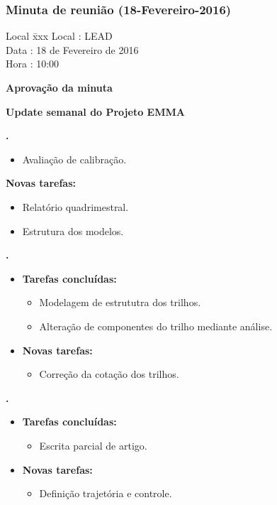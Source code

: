 \subsubsection{Minuta de reunião (18-Fevereiro-2016)}

\begin{tabbing}
  Local \= xxx \kill
  Local \> : LEAD \\
  Data  \> : 18 de Fevereiro de 2016 \\
  Hora  \> : 10:00
\end{tabbing} 


\textbf{Aprovação da minuta}

\textbf{Update semanal do Projeto EMMA}

						
\textbf{\gabriel.} 
	\begin{itemize}
			\item Avaliação de calibração.
			\end{itemize}
		
		\item \textbf{Novas tarefas:}
			\begin{itemize} 
				\item Relatório quadrimestral.
				\item Estrutura dos modelos.
			\end{itemize}

					
   \textbf{.} 
	\begin{itemize}
		\item \textbf{Tarefas concluídas:}
			\begin{itemize}    
			    \item Modelagem de estrututra dos trilhos.
			    \item Alteração de componentes do trilho mediante análise.
				
			\end{itemize}
		
		\item \textbf{Novas tarefas:}
			\begin{itemize} 
			    \item Correção da cotação dos trilhos.
			\end{itemize}
	\end{itemize}

	
	  \textbf{\elael.} 
	\begin{itemize}
		\item \textbf{Tarefas concluídas:}
			\begin{itemize}    
				\item Escrita parcial de artigo.
			\end{itemize}
		
		\item \textbf{Novas tarefas:}
			\begin{itemize} 
			    \item Definição trajetória e controle.
			\end{itemize}
	\end{itemize}			
			
